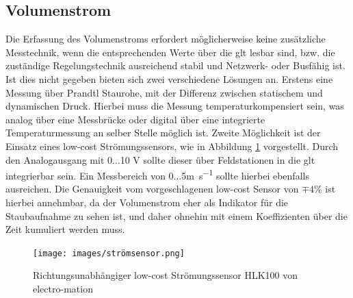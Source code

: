     \subsection{Volumenstrom}
    \label{sec:vstrom}
    Die Erfassung des Volumenstroms erfordert möglicherweise keine zusätzliche Messtechnik, wenn die entsprechenden Werte über die \ac{glt} lesbar sind, bzw. die zuständige Regelungstechnik ausreichend stabil und Netzwerk- oder Busfähig ist. Ist dies nicht gegeben bieten sich zwei verschiedene Lösungen an. Erstens eine Messung über Prandtl Staurohe, mit der Differenz zwischen statischem und dynamischen Druck. Hierbei muss die Messung temperaturkompensiert sein, was analog über eine Messbrücke oder digital über eine integrierte Temperaturmessung an selber Stelle möglich ist. Zweite Möglichkeit ist der Einsatz eines low-cost Strömungssensors, wie in Abbildung \ref{fi:strömsensor} vorgestellt. Durch den Analogausgang mit 0...10 V sollte dieser über Feldstationen in die \ac{glt} integrierbar sein. Ein Messbereich von 0...5\si{\metre\per\second}  sollte hierbei ebenfalls ausreichen. Die Genauigkeit vom vorgeschlagenen low-cost Sensor von $\mp 4\% $ ist hierbei annehmbar, da der Volumenstrom eher als Indikator für die Staubaufnahme zu sehen ist, und daher ohnehin mit einem Koeffizienten über die Zeit kumuliert werden muss.
    \begin{figure}[H]
        \begin{center}
            \texttt{[image: images/strömsensor.png]}
            \caption[Strömungssensor]{Richtungsunabhängiger low-cost Strömungssensor HLK100 von electro-mation \cite{strömsensor} }
            \label{fi:strömsensor}
        \end{center}
    \end{figure} 
